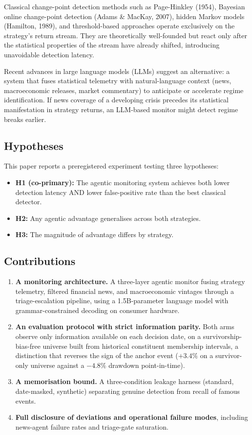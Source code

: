 \documentclass[11pt,a4paper]{article}
\providecommand{\tightlist}{\setlength{\itemsep}{0pt}\setlength{\parskip}{0pt}}
\begin{document}
Classical change-point detection methods such as Page-Hinkley (1954), Bayesian online change-point detection (Adams \& MacKay, 2007), hidden Markov models (Hamilton, 1989), and threshold-based approaches operate exclusively on the strategy's return stream. They are theoretically well-founded but react only after the statistical properties of the stream have already shifted, introducing unavoidable detection latency.

Recent advances in large language models (LLMs) suggest an alternative: a system that fuses statistical telemetry with natural-language context (news, macroeconomic releases, market commentary) to anticipate or accelerate regime identification. If news coverage of a developing crisis precedes its statistical manifestation in strategy returns, an LLM-based monitor might detect regime breaks earlier.

\subsection{Hypotheses}\label{sec:hypotheses}

This paper reports a preregistered experiment testing three hypotheses:

\begin{itemize}
\tightlist
\item \textbf{H1 (co-primary):} The agentic monitoring system achieves both lower detection latency AND lower false-positive rate than the best classical detector.
\item \textbf{H2:} Any agentic advantage generalises across both strategies.
\item \textbf{H3:} The magnitude of advantage differs by strategy.
\end{itemize}

\subsection{Contributions}\label{sec:contributions}

\begin{enumerate}
\tightlist
\item \textbf{A monitoring architecture.} A three-layer agentic monitor fusing strategy telemetry, filtered financial news, and macroeconomic vintages through a triage-escalation pipeline, using a 1.5B-parameter language model with grammar-constrained decoding on consumer hardware.
\item \textbf{An evaluation protocol with strict information parity.} Both arms observe only information available on each decision date, on a survivorship-bias-free universe built from historical constituent membership intervals, a distinction that reverses the sign of the anchor event ($+3.4\%$ on a survivor-only universe against a $-4.8\%$ drawdown point-in-time).
\item \textbf{A memorisation bound.} A three-condition leakage harness (standard, date-masked, synthetic) separating genuine detection from recall of famous events.
\item \textbf{Full disclosure of deviations and operational failure modes}, including news-agent failure rates and triage-gate saturation.
\end{enumerate}
\end{document}
